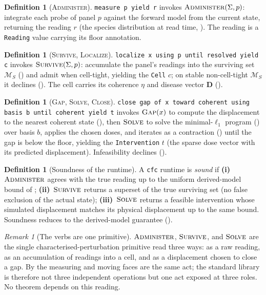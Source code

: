 \documentclass[11pt,a4paper]{article}
\theoremstyle{cfcthm}
\theoremstyle{definition}
\newtheorem{definition}[theorem]{Definition}
\theoremstyle{remark}
\newtheorem{remark}[theorem]{Remark}
\newcommand{\Man}{\mathcal{M}}          %
\newcommand{\ecoh}{\eta}                %
\newcommand{\dvec}{\mathbf{D}}          %
\newcommand{\cf}[1]{\texttt{#1}}
\begin{document}
\begin{definition}[\textsc{Administer}]
\label{def:administer}
\cf{measure p yield r} invokes $\textsc{Administer}(\Sigma,p)$: integrate each
probe of panel $p$ against the forward model from the current state, returning
the reading $r$ (the species distribution at read time, ). The
reading is a \cf{Reading} value carrying its floor annotation.
\end{definition}

\begin{definition}[\textsc{Survive}, \textsc{Localize}]
\label{def:localize}
\cf{localize x using p until resolved yield c} invokes
$\textsc{Survive}(\Sigma,p)$: accumulate the panel's readings into the surviving
set $\Man_S$ () and admit when cell-tight, yielding the
\cf{Cell} $c$; on stable non-cell-tight $\Man_S$ it declines
(). The cell carries its coherence $\ecoh$ and disease vector
$\dvec$ ().
\end{definition}

\begin{definition}[\textsc{Gap}, \textsc{Solve}, \textsc{Close}]
\label{def:close}
\cf{close gap of x toward coherent using basis b until coherent yield t}
invokes $\textsc{Gap}(x)$ to compute the displacement to the nearest coherent
state (), then $\textsc{Solve}$ to solve the minimal-$\ell_1$
program () over basis $b$, applies the chosen doses, and
iterates as a contraction () until the gap is below the
floor, yielding the \cf{Intervention} $t$ (the sparse dose vector with its
predicted displacement). Infeasibility declines
().
\end{definition}

\begin{definition}[Soundness of the runtime]
\label{def:soundness}
A \cf{cfc} runtime is \emph{sound} if \textbf{(i)}~$\textsc{Administer}$ agrees
with the true reading up to the uniform derived-model bound of
; \textbf{(ii)}~$\textsc{Survive}$ returns a superset of the
true surviving set (no false exclusion of the actual state);
\textbf{(iii)}~$\textsc{Solve}$ returns a feasible intervention whose simulated
displacement matches its physical displacement up to the same bound. Soundness
reduces to the derived-model guarantee ().
\end{definition}

\begin{remark}[The verbs are one primitive]
\label{rem:one-primitive}
$\textsc{Administer}$, $\textsc{Survive}$, and $\textsc{Solve}$ are the single
characterised-perturbation primitive read three ways: as a raw reading, as an
accumulation of readings into a cell, and as a displacement chosen to close a
gap. By  the measuring and moving faces are the same act; the
standard library is therefore not three independent operations but one act
exposed at three roles. No theorem depends on this reading.
\end{remark}
\end{document}
